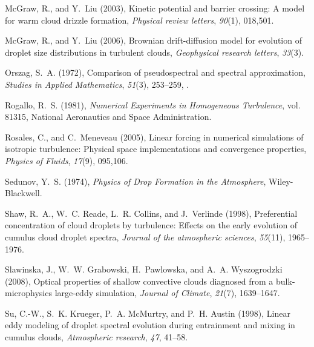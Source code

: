 \documentclass[draft,linenumbers]{agujournal}
\begin{document}
\begin{thebibliography}{60}
McGraw, R., and Y.~Liu (2003), Kinetic potential and barrier crossing: A model
  for warm cloud drizzle formation, \textit{Physical review letters},
  \textit{90}(1), 018,501.

McGraw, R., and Y.~Liu (2006), Brownian drift-diffusion model for evolution of
  droplet size distributions in turbulent clouds, \textit{Geophysical research
  letters}, \textit{33}(3).

Orszag, S.~A. (1972), Comparison of pseudospectral and spectral approximation,
  \textit{Studies in Applied Mathematics}, \textit{51}(3), 253--259,
  .

Rogallo, R.~S. (1981), \textit{Numerical Experiments in Homogeneous
  Turbulence}, vol. 81315, National Aeronautics and Space Administration.

Rosales, C., and C.~Meneveau (2005), Linear forcing in numerical simulations of
  isotropic turbulence: Physical space implementations and convergence
  properties, \textit{Physics of Fluids}, \textit{17}(9), 095,106.

Sedunov, Y.~S. (1974), \textit{Physics of Drop Formation in the Atmosphere},
  Wiley-Blackwell.

Shaw, R.~A., W.~C. Reade, L.~R. Collins, and J.~Verlinde (1998), Preferential
  concentration of cloud droplets by turbulence: Effects on the early evolution
  of cumulus cloud droplet spectra, \textit{Journal of the atmospheric
  sciences}, \textit{55}(11), 1965--1976.

Slawinska, J., W.~W. Grabowski, H.~Pawlowska, and A.~A. Wyszogrodzki (2008),
  Optical properties of shallow convective clouds diagnosed from a
  bulk-microphysics large-eddy simulation, \textit{Journal of Climate},
  \textit{21}(7), 1639--1647.

Su, C.-W., S.~K. Krueger, P.~A. McMurtry, and P.~H. Austin (1998), Linear eddy
  modeling of droplet spectral evolution during entrainment and mixing in
  cumulus clouds, \textit{Atmospheric research}, \textit{47}, 41--58.


\end{thebibliography}
\end{document}
